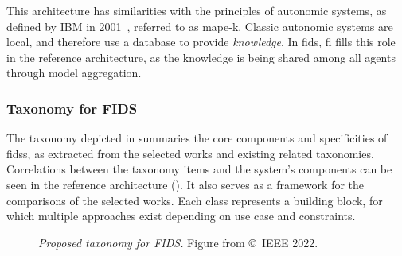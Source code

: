 This architecture has similarities with the principles of autonomic systems, as defined by IBM in 2001~\cite{kephart_visionautonomiccomputing_2003}, referred to as \gls{mape-k}.
Classic autonomic systems are local, and therefore use a database to provide \emph{knowledge}.
In \gls{fids}, \gls{fl} fills this role in the reference architecture, as the knowledge is being shared among all agents through model aggregation.


\subsubsection{Taxonomy for FIDS\label{sec:sota.discuss.synthesis.taxo}}

The taxonomy depicted in  summaries the core components and specificities of \glspl{fids}, as extracted from the selected works and existing related taxonomies.
Correlations between the taxonomy items and the system's components can be seen in the reference architecture ().
It also serves as a framework for the comparisons of the selected works.
Each class represents a building block, for which multiple approaches exist depending on use case and constraints.

\begin{figure}
  \centering
  \resizebox{\textwidth}{!}{}
  \caption[
    Proposed taxonomy for FIDS.
  ]{
   \emph{Proposed taxonomy for FIDS.}
    Figure from \textcite{lavaur_EvolutionFederatedLearningbased_2022} \copyright~IEEE 2022.
    \label{fig:sota.taxonomy}
  }
\end{figure}


